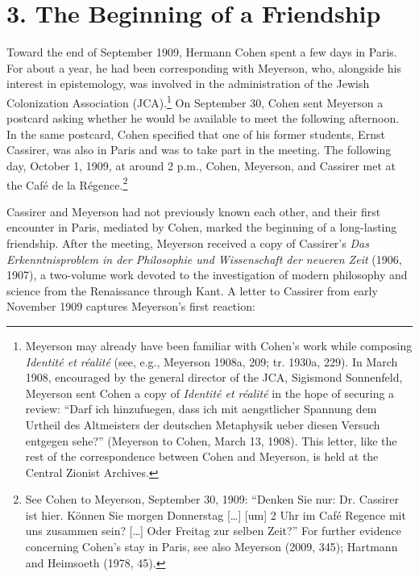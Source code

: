 \section*{3. The Beginning of a Friendship}

Toward the end of September 1909, Hermann Cohen spent a few days in Paris. For about a year, he had been corresponding with Meyerson, who, alongside his interest in epistemology, was involved in the administration of the Jewish Colonization Association (JCA).\footnote{Meyerson may already have been familiar with Cohen's work while composing \emph{Identité et réalité} (see, e.g., Meyerson 1908a, 209; tr. 1930a, 229). In March 1908, encouraged by the general director of the JCA, Sigismond Sonnenfeld, Meyerson sent Cohen a copy of \emph{Identité et réalité} in the hope of securing a review: ``Darf ich hinzufuegen, dass ich mit aengstlicher Spannung dem Urtheil des Altmeisters der deutschen Metaphysik ueber diesen Versuch entgegen sehe?'' (Meyerson to Cohen, March 13, 1908). This letter, like the rest of the correspondence between Cohen and Meyerson, is held at the Central Zionist Archives.} On September 30, Cohen sent Meyerson a postcard asking whether he would be available to meet the following afternoon. In the same postcard, Cohen specified that one of his former students, Ernst Cassirer, was also in Paris and was to take part in the meeting. The following day, October 1, 1909, at around 2 p.m., Cohen, Meyerson, and Cassirer met at the Café de la Régence.\footnote{See Cohen to Meyerson, September 30, 1909: ``Denken Sie nur: Dr. Cassirer ist hier. Können Sie morgen Donnerstag {[}\ldots{]} {[}um{]} 2 Uhr im Café Regence mit uns zusammen sein? {[}\ldots{]} Oder Freitag zur selben Zeit?'' For further evidence concerning Cohen's stay in Paris, see also Meyerson (2009, 345); Hartmann and Heimsoeth (1978, 45).}

Cassirer and Meyerson had not previously known each other, and their first encounter in Paris, mediated by Cohen, marked the beginning of a long-lasting friendship. After the meeting, Meyerson received a copy of Cassirer's \emph{Das Erkenntnisproblem in der Philosophie und Wissenschaft der neueren Zeit} (1906, 1907), a two-volume work devoted to the investigation of modern philosophy and science from the Renaissance through Kant. A letter to Cassirer from early November 1909 captures Meyerson's first reaction:

